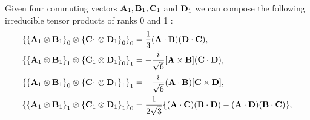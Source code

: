 Given four commuting vectors $\mathbf{A}_{1}, \mathbf{B}_{1}, \mathbf{C}_{1}$ and $\mathbf{D}_{1}$ we can compose the following irreducible tensor products of ranks 0 and 1 :
\begin{align}
\left\{\left\{\mathbf{A}_{1} \otimes \mathbf{B}_{1}\right\}_{0} \otimes\left\{\mathbf{C}_{1} \otimes \mathbf{D}_{1}\right\}_{0}\right\}_{0}&=\frac{1}{3}(\mathbf{A} \cdot \mathbf{B})(\mathbf{D} \cdot \mathbf{C}),  \label{eq:3:2:12}\\
\left\{\left\{\mathbf{A}_{1} \otimes \mathbf{B}_{1}\right\}_{1} \otimes\left\{\mathbf{C}_{1} \otimes \mathbf{D}_{1}\right\}_{0}\right\}_{1}&=-\frac{i}{\sqrt{6}}[\mathbf{A} \times \mathbf{B}](\mathbf{C} \cdot \mathbf{D}),  \label{eq:3:2:13}\\
\left\{\left\{\mathbf{A}_{1} \otimes \mathbf{B}_{1}\right\}_{0} \otimes\left\{\mathbf{C}_{1} \otimes \mathbf{D}_{1}\right\}_{1}\right\}_{1}&=-\frac{i}{\sqrt{6}}(\mathbf{A} \cdot \mathbf{B})[\mathbf{C} \times \mathbf{D}],  \label{eq:3:2:14}\\
\left\{\left\{\mathbf{A}_{1} \otimes \mathbf{B}_{1}\right\}_{1} \otimes\left\{\mathbf{C}_{1} \otimes \mathbf{D}_{1}\right\}_{1}\right\}_{0}&=\frac{1}{2 \sqrt{3}}\{(\mathbf{A} \cdot \mathbf{C})(\mathbf{B} \cdot \mathbf{D})-(\mathbf{A} \cdot \mathbf{D})(\mathbf{B} \cdot \mathbf{C})\}, \label{eq:3:2:15}
\end{align}
